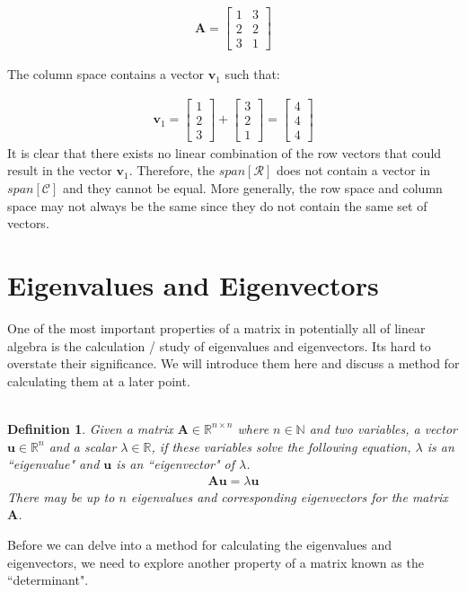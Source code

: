 \documentclass[a4paper,12pt]{book}
\newcommand{\set}[1]{\mathcal{#1}}
\newcommand{\matrx}[1]{\bm{#1}}
\newcommand{\vectr}[1]{\textbf{#1}}
\newcommand{\real}{\mathbb{R}}
\newcommand{\natral}{\mathbb{N}}
\newtheorem{definition}{Definition}[section]
\begin{document}
	\begin{align}
		\matrx{A} = \begin{bmatrix}
			1 & 3 \\
			2 & 2 \\
			3 & 1 
		\end{bmatrix}
	\end{align} 

	The column space contains a vector $ \vectr{v}_1 $ such that:
	
	\begin{align}
		\vectr{v}_1 = \begin{bmatrix}
			1 \\
			2 \\
			3 
		\end{bmatrix} + \begin{bmatrix}
		3 \\
		2 \\
		1 
	\end{bmatrix} = \begin{bmatrix}
		4 \\
		4 \\
		4 
	\end{bmatrix}
 	\end{align}
	It is clear that there exists no linear combination of the row vectors that could result in the vector $ \vectr{v}_1 $. Therefore, the $ span[\set{R}] $ does not contain a vector in $ span[\set{C}] $ and they cannot be equal. More generally, the row space and column space may not always be the same since they do not contain the same set of vectors. 
	\section{Eigenvalues and Eigenvectors} \label{sec:eigen}
	One of the most important properties of a matrix in potentially all of linear algebra is the calculation / study of eigenvalues and eigenvectors. Its hard to overstate their significance. We will introduce them here and discuss a method for calculating them at a later point. 
	\\\\
	\begin{definition}
		\normalfont Given a matrix $ \matrx{A} \in \real^{n \times n} $ where $ n \in \natral $ and two variables, a vector $ \vectr{u} \in \real^{n} $ and a scalar $ \lambda \in \real $, if these variables solve the following equation, $ \lambda $ is an ``eigenvalue" and $ \vectr{u} $ is an ``eigenvector" of $ \lambda $.
		\begin{align}
			\matrx{A} \vectr{u} = \lambda \vectr{u}
		\end{align}
		There may be up to $ n $ eigenvalues and corresponding eigenvectors for the matrix $ \matrx{A} $.
		\label{def:eigenvalue_eigenvector} 
	\end{definition} 
	Before we can delve into a method for calculating the eigenvalues and eigenvectors, we need to explore another property of a matrix known as the ``determinant".
\end{document}
